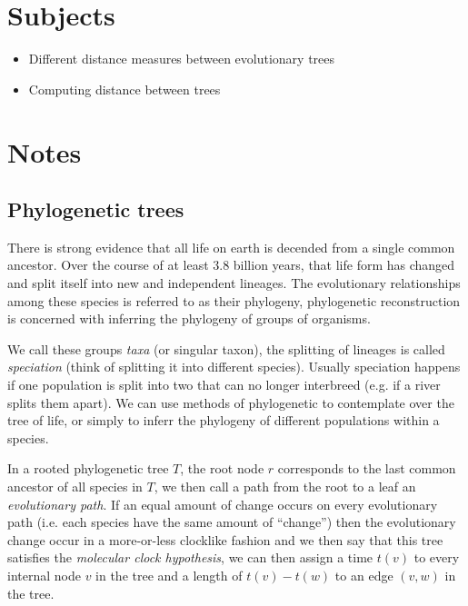 


    \section{Subjects}
    \begin{itemize}
        \item Different distance measures between evolutionary trees
        \item Computing distance between trees
    \end{itemize}
    
    \section{Notes}
    
    \subsection{Phylogenetic trees}
    There is strong evidence that all life on earth is decended from a single 
    common ancestor. Over the course of at least 3.8 billion years, that life 
    form has changed and split itself into new and independent lineages. The 
    evolutionary relationships among these species is referred to as their 
    phylogeny, phylogenetic reconstruction is concerned with inferring the 
    phylogeny of groups of organisms.
    
    We call these groups \textit{taxa} (or singular taxon), the splitting of 
    lineages is called \textit{speciation} (think of splitting it into 
    different species). Usually speciation happens if one population is split 
    into two that can no longer interbreed (e.g. if a river splits them apart). 
    We can use methods of phylogenetic to contemplate over the tree of life, or 
    simply to inferr the phylogeny of different populations within a species.
    
    In a rooted phylogenetic tree $T$, the root node $r$ corresponds to the 
    last common ancestor of all species in $T$, we then call a path from the 
    root to a leaf an \textit{evolutionary path}. If an equal amount of change 
    occurs on every evolutionary path (i.e. each species have the same amount 
    of ``change'') then the evolutionary change occur in a more-or-less 
    clocklike fashion and we then say that this tree satisfies the 
    \textit{molecular clock hypothesis}, we can then assign a time $t(v)$ to 
    every internal node $v$ in the tree and a length of $t(v)-t(w)$ to an edge 
    $(v,w)$ in the tree.
    
